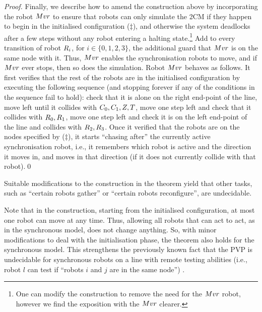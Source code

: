 \begin{proof}
Finally, we describe how to amend the construction above by incorporating the robot $Mvr$ to ensure that robots can only simulate the 2CM if they happen to begin in the initialised configuration ($\ddagger$), and otherwise the system deadlocks after a few steps without any robot entering a halting state.\footnote{One can modify the construction to remove the need for the $Mvr$ robot, however we find the exposition with the $Mvr$ clearer.}  Add to every transition of robot $R_i$, for $i \in \{0,1,2,3\}$, the additional guard that $Mvr$ is on the same node with it. Thus, $Mvr$ enables the synchronisation robots to move, and if $Mvr$ ever stops, then so does the simulation. Robot $Mvr$ behaves as follows. It first verifies that the rest of the robots are in the initialised configuration by executing the following sequence (and stopping forever if any of the conditions in the sequence fail to hold): check that it is alone on the right end-point of the line, move left until it collides with $C_0,C_1,Z,T$, move one step left and check that it collides with $R_0,R_1$, move one step left and check it is on the left end-point of the line and collides with $R_2,R_3$. Once it verified that the robots are on the nodes specified by ($\ddagger$), it starts ``chasing after'' the currently active synchronisation robot, i.e., it remembers which robot is active and the direction it moves in, and moves in that direction (if it does not currently collide with that robot).\qed

\end{proof}

Suitable modifications to the construction in the theorem yield that other tasks, such as ``certain robots gather'' or ``certain robots reconfigure'', are undecidable.


\begin{remark} \label{rem:synch}
Note that in the construction, starting from the initialised configuration, at most one robot can move at any time. Thus, allowing all robots that can act to act, as in the synchronous model, does not change anything. So, with minor modifications to deal with the initialisation phase, the theorem also holds for the synchronous model. This strengthens the previously known fact that the PVP is undecidable for synchronous robots on a line with remote testing abilities
(i.e., robot $l$ can test if ``robots $i$ and $j$ are in the same node'') \cite{Rubin15AAMAS}.
\end{remark}

